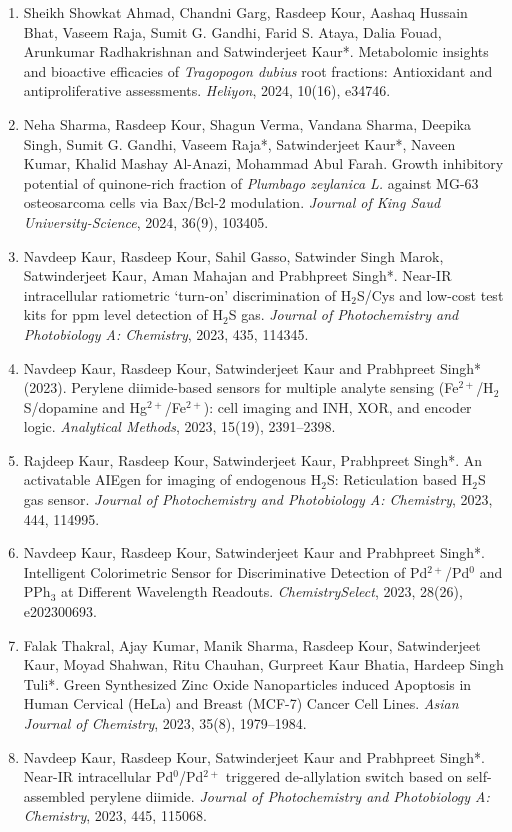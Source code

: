 \documentclass[11pt,a4paper]{article}
\begin{document}
\begin{enumerate}
  \item Sheikh Showkat Ahmad, Chandni Garg, Rasdeep Kour, Aashaq Hussain Bhat, Vaseem Raja, Sumit G. Gandhi, Farid S. Ataya, Dalia Fouad, Arunkumar Radhakrishnan and Satwinderjeet Kaur*. Metabolomic insights and bioactive efficacies of \textit{Tragopogon dubius} root fractions: Antioxidant and antiproliferative assessments. \textit{Heliyon}, 2024, 10(16), e34746.
  \item Neha Sharma, Rasdeep Kour, Shagun Verma, Vandana Sharma, Deepika Singh, Sumit G. Gandhi, Vaseem Raja*, Satwinderjeet Kaur*, Naveen Kumar, Khalid Mashay Al-Anazi, Mohammad Abul Farah. Growth inhibitory potential of quinone-rich fraction of \textit{Plumbago zeylanica L.} against MG-63 osteosarcoma cells via Bax/Bcl-2 modulation. \textit{Journal of King Saud University-Science}, 2024, 36(9), 103405.
  \item Navdeep Kaur, Rasdeep Kour, Sahil Gasso, Satwinder Singh Marok, Satwinderjeet Kaur, Aman Mahajan and Prabhpreet Singh*. Near-IR intracellular ratiometric `turn-on' discrimination of H$_2$S/Cys and low-cost test kits for ppm level detection of H$_2$S gas. \textit{Journal of Photochemistry and Photobiology A: Chemistry}, 2023, 435, 114345.
  \item Navdeep Kaur, Rasdeep Kour, Satwinderjeet Kaur and Prabhpreet Singh* (2023). Perylene diimide-based sensors for multiple analyte sensing (Fe$^{2+}$/H$_2$S/dopamine and Hg$^{2+}$/Fe$^{2+}$): cell imaging and INH, XOR, and encoder logic. \textit{Analytical Methods}, 2023, 15(19), 2391--2398.
  \item Rajdeep Kaur, Rasdeep Kour, Satwinderjeet Kaur, Prabhpreet Singh*. An activatable AIEgen for imaging of endogenous H$_2$S: Reticulation based H$_2$S gas sensor. \textit{Journal of Photochemistry and Photobiology A: Chemistry}, 2023, 444, 114995.
  \item Navdeep Kaur, Rasdeep Kour, Satwinderjeet Kaur and Prabhpreet Singh*. Intelligent Colorimetric Sensor for Discriminative Detection of Pd$^{2+}$/Pd$^0$ and PPh$_3$ at Different Wavelength Readouts. \textit{ChemistrySelect}, 2023, 28(26), e202300693.
  \item Falak Thakral, Ajay Kumar, Manik Sharma, Rasdeep Kour, Satwinderjeet Kaur, Moyad Shahwan, Ritu Chauhan, Gurpreet Kaur Bhatia, Hardeep Singh Tuli*. Green Synthesized Zinc Oxide Nanoparticles induced Apoptosis in Human Cervical (HeLa) and Breast (MCF-7) Cancer Cell Lines. \textit{Asian Journal of Chemistry}, 2023, 35(8), 1979--1984.
  \item Navdeep Kaur, Rasdeep Kour, Satwinderjeet Kaur and Prabhpreet Singh*. Near-IR intracellular Pd$^0$/Pd$^{2+}$ triggered de-allylation switch based on self-assembled perylene diimide. \textit{Journal of Photochemistry and Photobiology A: Chemistry}, 2023, 445, 115068.

\end{enumerate}
\end{document}
